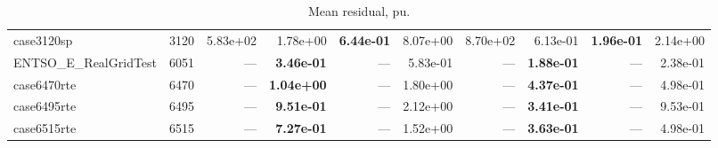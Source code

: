 \documentclass[10pt]{article}
\begin{document}
\begin{table}[H]
\begin{tabular}{lr rrrr rrrr}
case3120sp & 3120 & 5.83e+02 & 1.78e+00 & \textbf{6.44e-01} & 8.07e+00 & 8.70e+02 & 6.13e-01 & \textbf{1.96e-01} & 2.14e+00 \\
ENTSO\_E\_RealGridTest & 6051 & --- & \textbf{3.46e-01} & --- & 5.83e-01 & --- & \textbf{1.88e-01} & --- & 2.38e-01 \\
case6470rte & 6470 & --- & \textbf{1.04e+00} & --- & 1.80e+00 & --- & \textbf{4.37e-01} & --- & 4.98e-01 \\
case6495rte & 6495 & --- & \textbf{9.51e-01} & --- & 2.12e+00 & --- & \textbf{3.41e-01} & --- & 9.53e-01 \\
case6515rte & 6515 & --- & \textbf{7.27e-01} & --- & 1.52e+00 & --- & \textbf{3.63e-01} & --- & 4.98e-01 \\
\bottomrule
\end{tabular}
\caption{Mean residual, pu.}
\end{table}
\end{document}
